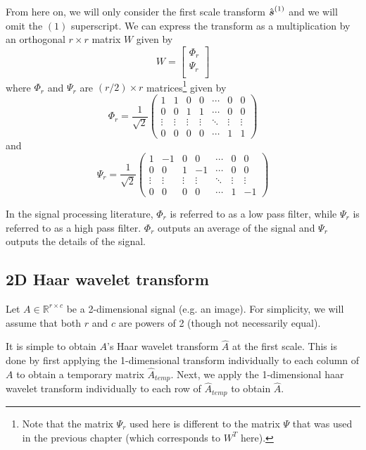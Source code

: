 From here on, we will only consider the first scale transform $\hat{\boldsymbol s}^{(1)}$ and we will omit the $(1)$ superscript.
We can express the transform as a multiplication by an orthogonal $r\times r$ matrix $W$ given by
\begin{equation}
W = \begin{bmatrix}
  \Phi_r \\
  \Psi_r \\
\end{bmatrix}
\end{equation}
where $\Phi_r$ and $\Psi_r$ are $(r/2)\times r$ matrices\footnote{Note that the matrix $\Psi_r$ used here is different to the matrix $\Psi$ that was used in the previous chapter (which corresponds to $W^T$ here).} given by
\begin{equation*}
\Phi_r = \frac{1}{\sqrt{2}} \begin{pmatrix}
1&1&0&0&\cdots&0&0\\
0&0&1&1&\cdots&0&0\\
\vdots&\vdots&\vdots&\vdots&\ddots&\vdots&\vdots\\
0&0&0&0&\cdots&1&1
\end{pmatrix}
\end{equation*}
and 
\begin{equation*}
\Psi_r = \frac{1}{\sqrt{2}} \begin{pmatrix}
1&-1&0&0&\cdots&0&0\\
0&0&1&-1&\cdots&0&0\\
\vdots&\vdots&\vdots&\vdots&\ddots&\vdots&\vdots\\
0&0&0&0&\cdots&1&-1
\end{pmatrix}
\end{equation*}


In the signal processing literature, $\Phi_r$ is referred to as a low pass filter, while $\Psi_r$ is referred to as a high pass filter.
$\Phi_r$ outputs an average of the signal and $\Psi_r$ outputs the details of the signal.

\subsection{2D Haar wavelet transform}
Let $A \in \mathbb{R}^{r\times c}$ be a 2-dimensional signal (e.g. an image).
For simplicity, we will assume that both $r$ and $c$ are powers of 2 (though not necessarily equal).

It is simple to obtain $A$'s Haar wavelet transform $\hat{A}$ at the first scale.
This is done by first applying the 1-dimensional transform individually to each column of $A$ to obtain a temporary matrix $\hat A_{temp}$.
Next, we apply the 1-dimensional haar wavelet transform individually to each row of $\hat A_{temp}$ to obtain $\hat A$.

